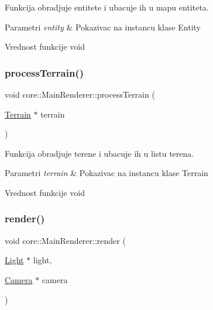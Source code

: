 Funkcija obradjuje entitete i ubacuje ih u mapu entiteta. 


\begin{DoxyParams}{Parametri}
{\em entity} & Pokazivac na instancu klase Entity \\
\hline
\end{DoxyParams}
\begin{DoxyReturn}{Vrednost funkcije}
void 
\end{DoxyReturn}
\mbox{\label{classcore_1_1MainRenderer_a4e8a3e6729a7d948761d6e74c48a6236}} 
\subsubsection{\texorpdfstring{process\+Terrain()}{processTerrain()}}
{\footnotesize\ttfamily void core\+::\+Main\+Renderer\+::process\+Terrain (\begin{DoxyParamCaption}\item[{\hyperlink{classterrain_1_1Terrain}{Terrain} $\ast$}]{terrain }\end{DoxyParamCaption})}



Funkcija obradjuje terene i ubacuje ih u listu terena. 


\begin{DoxyParams}{Parametri}
{\em terrain} & Pokazivac na instancu klase Terrain \\
\hline
\end{DoxyParams}
\begin{DoxyReturn}{Vrednost funkcije}
void 
\end{DoxyReturn}
\mbox{\label{classcore_1_1MainRenderer_a3a8f4927df78f7b0ea7c4e5902569b1e}} 
\subsubsection{\texorpdfstring{render()}{render()}}
{\footnotesize\ttfamily void core\+::\+Main\+Renderer\+::render (\begin{DoxyParamCaption}\item[{\hyperlink{classentity_1_1Light}{Light} $\ast$}]{light,  }\item[{\hyperlink{classentity_1_1Camera}{Camera} $\ast$}]{camera }\end{DoxyParamCaption})}



